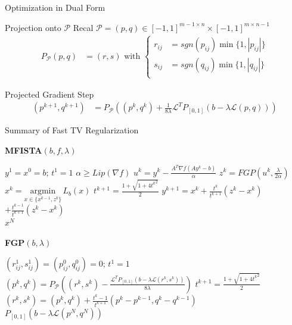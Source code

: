 \documentclass[12pt]{beamer}
\begin{document}
\begin{frame}{Optimization in Dual Form}

\begin{exampleblock}{Projection onto $\mathcal{P}$}
Recal $\mathcal{P} = (p,q) \in [-1,1]^{m-1 \times n}\times[-1,1]^{m \times n-1}$
\begin{align*}
P_\mathcal{P}(p,q) &= (r,s) \text{ with } \left\{ \begin{aligned}
r_{ij} &= sgn(p_{ij} ) \min \{ 1, |p_{ij}| \}\\
s_{ij} &= sgn(q_{ij} ) \min \{ 1, |q_{ij}| \}\\
\end{aligned}\right.
\end{align*}
\end{exampleblock}

\begin{exampleblock}{Projected Gradient Step}
\begin{align*}
(p^{k+1},q^{k+1} ) &= P_\mathcal{P} \left((p^k, q^k) + \frac{1}{8\lambda} \mathcal{L}^TP_{[0,1]} (b - \lambda \mathcal{L}(p,q)) \right)
\end{align*}
\end{exampleblock}

\end{frame}

\begin{frame}{Summary of Fast TV Regularization}
\begin{spacing}{1.6}
\fontsize{9}{10}\selectfont
\hspace{-3 mm}
\begin{minipage}{0.4\textwidth}
\textbf{MFISTA$(b,f, \lambda)$}
\begin{algorithmic}
\State $y^1 = x^0 = b; \, t^1 = 1$
\State $\alpha \geq Lip(\nabla f)$
	\State $u^k = y^k - \frac{A^T\nabla f (A y^k - b)}{\alpha}$
	\State $z^k = FGP(u^k, \frac{\lambda}{2 \alpha})$
	\State $x^k = \underset{x \in \{x^{k-1},z^k\}}{\text{argmin}} \,L_b(x)$
	\State $t^{k+1} = \frac{1 + \sqrt{1 + 4{t^k}^2}}{2}$ 
	\State $y^{k+1} = x^k + \frac{t^k}{t^{k+1}}(z^k - x^k)$ 
	\State \hspace{10 mm}$+ \frac{t^{k-1}}{t^{k+1}}(z^k - x^k) $
\EndFor\\
\Return $x^N$
\end{algorithmic}
\end{minipage}
\begin{minipage}{0.6\textwidth}

\textbf{FGP$(b, \lambda)$}
\begin{algorithmic}
\State $(r_{ij}^1, s_{ij}^1) = (p_{ij}^0, q_{ij}^0) = 0; \, t^1 = 1$
	\State $(p^k,q^k) = P_\mathcal{P} \left( (r^k,s^k) - \frac{\mathcal{L}^TP_{[0,1]} (b - \lambda \mathcal{L}(r^k,s^k))}{8\lambda} \right)$
	\State $t^{k+1} = \frac{1 + \sqrt{1 + 4{t^k}^2}}{2}$ 
	\State $(r^k,s^k) = (p^k,q^k) + \frac{t^k-1}{t^{k+1}}(p^k-p^{k-1}, q^k-q^{k-1})$ 
\EndFor \\
\Return $P_{[0,1]} (b - \lambda \mathcal{L}(p^N,q^N))$
\end{algorithmic}

\end{minipage}
\end{spacing}
\end{frame}
\end{document}
